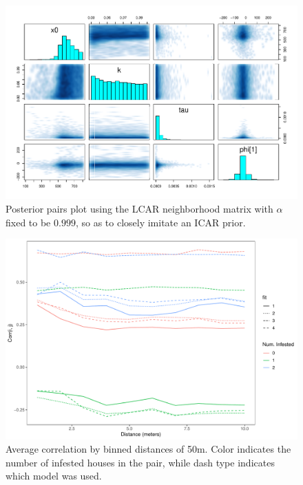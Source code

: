 \documentclass{scrartcl}
\begin{document}
\begin{figure}
  \centering
\includegraphics[width=.9\linewidth]{pairs-alpha-fixed}
\caption{Posterior pairs plot using the LCAR neighborhood matrix with
  $\alpha$ fixed to be $0.999$, so as to closely imitate an ICAR
  prior.}
  \label{fig:pairs-full}
\end{figure}

\begin{figure}
  \centering
  \includegraphics[width=\linewidth]{mean-corr-all}
  \caption{Average correlation by binned distances of 50m. Color
    indicates the number of infested houses in the pair, while dash
    type indicates which model was used.}
  \label{fig:mean-corr-all}
\end{figure}





\end{document}
